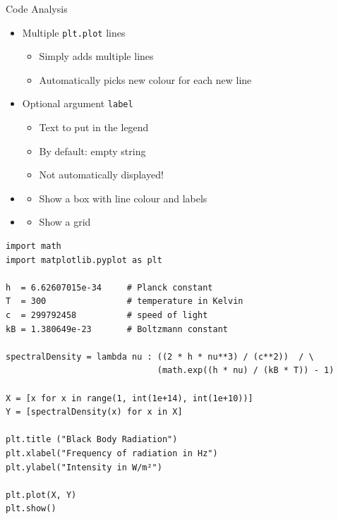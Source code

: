 \begin{frame}[fragile]{Code Analysis}
%
\begin{itemize}
\item Multiple \texttt{plt.plot} lines
	\begin{itemize}
	\item Simply adds multiple lines
	\item Automatically picks new colour for each new line
	\end{itemize}
\item Optional argument \texttt{label}
	\begin{itemize}
	\item Text to put in the legend
	\item By default: empty string
	\item Not automatically displayed!
	\end{itemize}
\item {}
	\begin{itemize}
	\item Show a box with line colour and labels
	\end{itemize}
\item {}
	\begin{itemize}
	\item Show a grid
	\end{itemize}
\end{itemize}
%
\end{frame}


\begin{frame}[fragile]
%
\vspace{-5pt}
\begin{codebox}
\begin{verbatim}
import math
import matplotlib.pyplot as plt

h  = 6.62607015e-34     # Planck constant
T  = 300                # temperature in Kelvin
c  = 299792458          # speed of light
kB = 1.380649e-23       # Boltzmann constant

spectralDensity = lambda nu : ((2 * h * nu**3) / (c**2))  / \
                              (math.exp((h * nu) / (kB * T)) - 1)

X = [x for x in range(1, int(1e+14), int(1e+10))]
Y = [spectralDensity(x) for x in X]

plt.title ("Black Body Radiation")
plt.xlabel("Frequency of radiation in Hz")
plt.ylabel("Intensity in W/m²")

plt.plot(X, Y)
plt.show()
\end{verbatim}
\end{codebox}
%
%
\end{frame}

